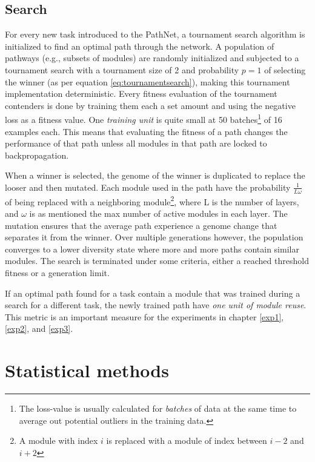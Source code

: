 \subsection{Search}\label{background:pathnet.search}
For every new task introduced to the PathNet, a tournament search algorithm is initialized to find an optimal path through the network. A population of pathways (e.g., subsets of modules) are randomly initialized and subjected to a tournament search with a tournament size of 2 and probability \(p=1\) of selecting the winner (as per equation \ref{eq:tournamentsearch}), making this tournament implementation deterministic. Every fitness evaluation of the tournament contenders is done by training them each a set amount and using the negative loss as a fitness value. One \textit{training unit} is quite small at 50 batches\footnote{The loss-value is usually calculated for \textit{batches} of data at the same time to average out potential outliers in the training data.} of 16 examples each. This means that evaluating the fitness of a path changes the performance of that path unless all modules in that path are locked to backpropagation.

When a winner is selected, the genome of the winner is duplicated to replace the looser and then mutated. Each module used in the path have the probability \(\frac{1}{L\omega}\) of being replaced with a neighboring module\footnote{A module with index \(i\) is replaced with a module of index between \(i-2\) and \(i+2\)}, where L is the number of layers, and \(\omega\) is as mentioned the max number of active modules in each layer. The mutation ensures that the average path experience a genome change that separates it from the winner. Over multiple generations however, the population converges to a lower diversity state where more and more paths contain similar modules. The search is terminated under some criteria, either a reached threshold fitness or a generation limit. 

If an optimal path found for a task contain a module that was trained during a search for a different task, the newly trained path have \textit{one unit of module reuse}. This metric is an important measure for the experiments in chapter \ref{exp1}, \ref{exp2}, and \ref{exp3}.

\section{Statistical methods}
